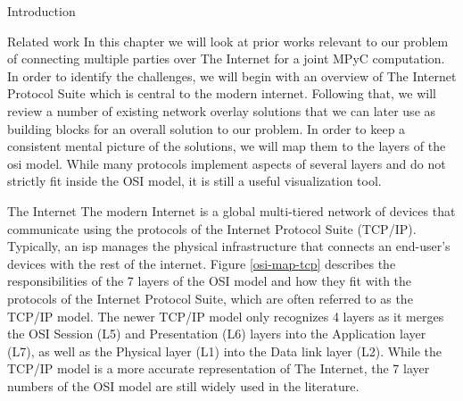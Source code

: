 \begin{frame}
\hypertarget{thesis__001-preamble.md}{}
\tableofcontents

\printnoidxglossary[type=\acronymtype,title=List of Abbreviations]
\listoffigures

\mainmatter
\end{frame}

\hypertarget{thesis__010-intro.md}{}
\begin{frame}{Introduction}
\protect\hypertarget{thesis__010-intro.md__introduction}{}
\end{frame}

\hypertarget{thesis__020-related-work.md}{}
\begin{frame}[fragile]{Related work}
\protect\hypertarget{thesis__020-related-work.md__related-work}{}
In this chapter we will look at prior works relevant to our problem of
connecting multiple parties over The Internet for a joint MPyC
computation. In order to identify the challenges, we will begin with an
overview of The Internet Protocol Suite which is central to the modern
internet. Following that, we will review a number of existing network
overlay solutions that we can later use as building blocks for an
overall solution to our problem. In order to keep a consistent mental
picture of the solutions, we will map them to the layers of the
\gls{osi} model. While many protocols implement aspects of several
layers and do not strictly fit inside the OSI model, it is still a
useful visualization tool.

\begin{block}{The Internet}
\protect\hypertarget{thesis__020-related-work.md__the-internet}{}
The modern Internet is a global multi-tiered network of devices that
communicate using the protocols of the Internet Protocol Suite (TCP/IP).
Typically, an \gls{isp} manages the physical infrastructure that
connects an end-user's devices with the rest of the internet. Figure
\ref{osi-map-tcp} describes the responsibilities of the 7 layers of the
OSI model and how they fit with the protocols of the Internet Protocol
Suite, which are often referred to as the TCP/IP model. The newer TCP/IP
model only recognizes 4 layers as it merges the OSI Session (L5) and
Presentation (L6) layers into the Application layer (L7), as well as the
Physical layer (L1) into the Data link layer (L2). While the TCP/IP
model is a more accurate representation of The Internet, the 7 layer
numbers of the OSI model are still widely used in the literature.


\end{block}
\end{frame}
